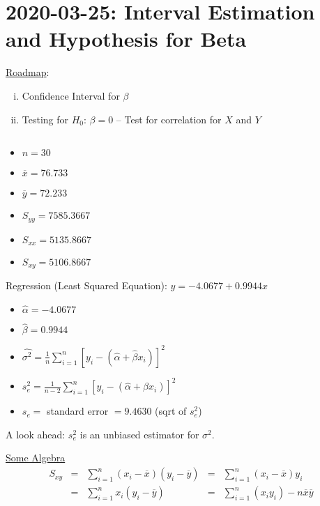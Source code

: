\section{2020-03-25: Interval Estimation and Hypothesis for Beta}
\underline{Roadmap}:
\begin{enumerate}[(i)]
    \item Confidence Interval for $ \beta $
    \item Testing for $ H_0 $: $ \beta=0 $ -- Test for correlation for
          $ X $ and $ Y $
\end{enumerate}

\begin{exbox}
    \begin{example} $ \; $
        \begin{itemize}
            \item $ n=30 $
            \item $ \overline{x}=76.733 $
            \item $ \overline{y}=72.233 $
            \item $ S_{yy}=7585.3667 $
            \item $ S_{xx}=5135.8667 $
            \item $ S_{xy}=5106.8667 $
        \end{itemize}
        Regression (Least Squared Equation): $ y=-4.0677+0.9944x $
        \begin{itemize}
            \item $ \hat{\alpha}=-4.0677 $
            \item $ \hat{\beta}=0.9944 $
            \item $ \hat{\sigma^2}=\frac{1}{n} \sum\limits_{i=1}^{n} \left[ y_i-(\hat{\alpha}+\hat{\beta}x_i) \right]^2 $
            \item $ s_e^2=\frac{1}{n-2} \sum\limits_{i=1}^{n} \left[ y_i-(\hat{\alpha}+\beta x_i) \right]^2 $
            \item $ s_e = $ standard error $ =9.4630 $ (sqrt of $ s_e^2 $)
        \end{itemize}
        A look ahead: $ s_e^2 $ is an unbiased estimator for $ \sigma^2 $.
    \end{example}
\end{exbox}
\underline{Some Algebra}
\[ \begin{aligned}
        S_{xy} & = & \sum\limits_{i=1}^{n} (x_i-\overline{x})(y_i-\overline{y}) & = & \sum\limits_{i=1}^{n} (x_i-\overline{x})y_i                \\
               & = & \sum\limits_{i=1}^{n} x_i(y_i-\overline{y})                & = & \sum\limits_{i=1}^{n} (x_iy_i) - n\overline{x}\overline{y}
    \end{aligned}
\]
